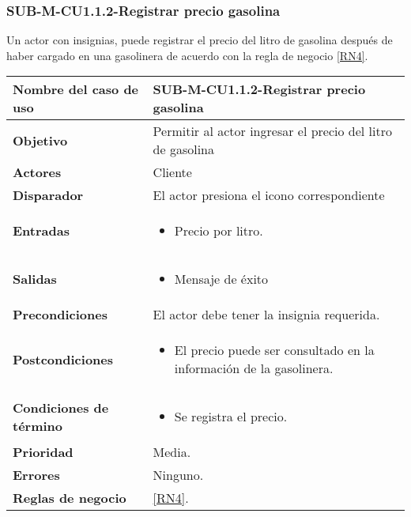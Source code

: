 \subsubsection{SUB-M-CU1.1.2-Registrar precio gasolina}\label{SUB-M-CU1.1.2}
Un actor con insignias, puede registrar el precio del litro de gasolina después de haber cargado en una gasolinera de acuerdo con la regla de negocio \ref{RN4}.

\begin{longtable}{|J{5cm}|J{10.3cm}|}
	\hline
	\textbf{Nombre del caso de uso} &
		SUB-M-CU1.1.2-Registrar precio gasolina \\ \hline
	\textbf{Objetivo} &
		Permitir al actor ingresar el precio del litro de gasolina \\ \hline
	\textbf{Actores} &
		Cliente \\ \hline 
	\textbf{Disparador} & 
		El actor presiona el icono correspondiente \\ \hline 
	\textbf{Entradas} & 
		\begin{itemize}
				\item Precio por litro.
		\end{itemize}\\ \hline
	\textbf{Salidas} & 
		\begin{itemize}
			\item Mensaje de éxito
		\end{itemize} \\ \hline
	\textbf{Precondiciones} &
		El actor debe tener la insignia requerida.\\ \hline
	\textbf{Postcondiciones} &
		\begin{itemize}
			\item El precio puede ser consultado en la información de la gasolinera.
		\end{itemize} \\ \hline
	\textbf{Condiciones de término} & 
		\begin{itemize}
			\item Se registra el precio.
		\end{itemize} \\ \hline 
	\textbf{Prioridad} & 
		Media. \\ \hline
	\textbf{Errores} & Ninguno.
		\\ \hline
	\textbf{Reglas de negocio} & \ref{RN4}.
		 \\ \hline
\end{longtable}

